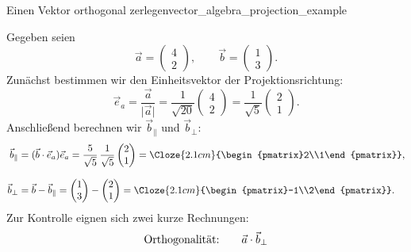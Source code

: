 \begin{ExampleBox}{Einen Vektor orthogonal zerlegen}{vector_algebra_projection_example}
  \noindent
  \begin{minipage}[c]{0.60\linewidth}
    Gegeben seien
    \[
      \vec a=\begin{pmatrix}4\\2\end{pmatrix},
      \qquad
      \vec b=\begin{pmatrix}1\\3\end{pmatrix}.
    \]
    Zunächst bestimmen wir den Einheitsvektor der Projektionsrichtung:
    \[
      \vec e_a
        =\frac{\vec a}{\lvert\vec a\rvert}
        =\frac{1}{\sqrt{20}}\begin{pmatrix}4\\2\end{pmatrix}
        =\frac{1}{\sqrt{5}}\begin{pmatrix}2\\1\end{pmatrix}.
    \]
    Anschließend berechnen wir $\vec b_{\parallel}$ und $\vec b_{\perp}$:
    \[
      \begin{aligned}
        \vec b_{\parallel}
          &=(\vec b\cdot\vec e_a)\vec e_a
            =\frac{5}{\sqrt{5}}\,
            \frac{1}{\sqrt{5}}\begin{pmatrix}2\\1\end{pmatrix}
            =\Cloze{2.1cm}{\begin{pmatrix}2\\1\end{pmatrix}}, \\[0.8em]
        \vec b_{\perp}
          &=\vec b-\vec b_{\parallel}
            =\begin{pmatrix}1\\3\end{pmatrix}
            -\begin{pmatrix}2\\1\end{pmatrix}
            =\Cloze{2.1cm}{\begin{pmatrix}-1\\2\end{pmatrix}}.
      \end{aligned}
    \]
    Zur Kontrolle eignen sich zwei kurze Rechnungen:
    \[
      \begin{array}{@{}r@{\qquad}l@{}}
        \text{Orthogonalität:}
          &\displaystyle \vec a\cdot\vec b_{\perp}

\end{array}\]
\end{minipage}
\end{ExampleBox}
